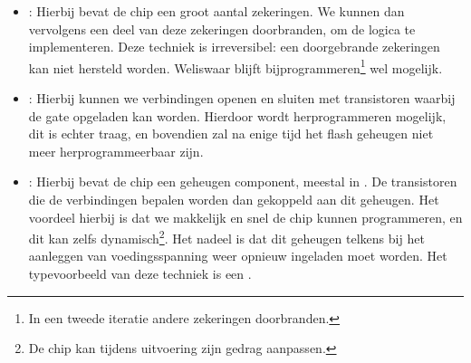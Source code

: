 \begin{itemize}
 \item {}: Hierbij bevat de chip een groot aantal zekeringen. We kunnen dan vervolgens een deel van deze zekeringen doorbranden, om de logica te implementeren. Deze techniek is irreversibel: een doorgebrande zekeringen kan niet hersteld worden. Weliswaar blijft bijprogrammeren\footnote{In een tweede iteratie andere zekeringen doorbranden.} wel mogelijk.
 \item {}: Hierbij kunnen we verbindingen openen en sluiten met transistoren waarbij de gate opgeladen kan worden. Hierdoor wordt herprogrammeren mogelijk, dit is echter traag, en bovendien zal na enige tijd het flash geheugen niet meer herprogrammeerbaar zijn.
 \item {}: Hierbij bevat de chip een geheugen component, meestal in . De transistoren die de verbindingen bepalen worden dan gekoppeld aan dit geheugen. Het voordeel hierbij is dat we makkelijk en snel de chip kunnen programmeren, en dit kan zelfs dynamisch\footnote{De chip kan tijdens uitvoering zijn gedrag aanpassen.}. Het nadeel is dat dit geheugen telkens bij het aanleggen van voedingsspanning weer opnieuw ingeladen moet worden. Het typevoorbeeld van deze techniek is een .%
\end{itemize}

